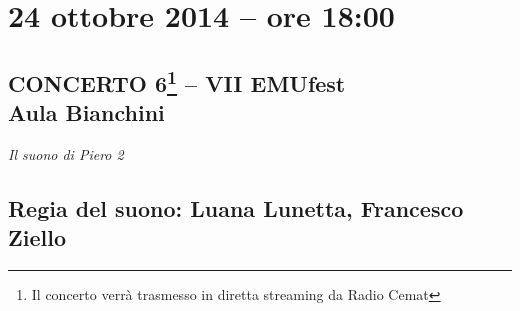 \documentclass[9pt, twoside, a5paper]{extreport}
\begin{document}
\clearpage



\section*{24 ottobre 2014 -- ore 18:00}
\subsection*{{\small CONCERTO 6\footnote{{\normalsize Il concerto verrà trasmesso in diretta streaming da Radio Cemat}} -- VII EMUfest\\}\textsf{Aula Bianchini\\}}

{\fontsize{30}{30}\selectfont \textit{Il suono di Piero 2}}

\subsection*{\textsf{Regia del suono: Luana Lunetta, Francesco Ziello}}

\bigskip
\end{document}
